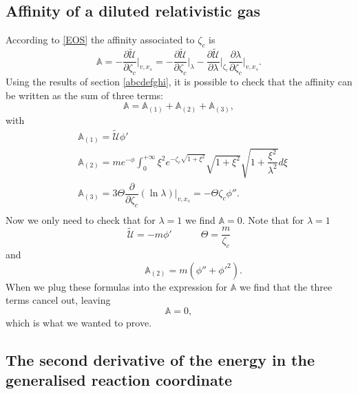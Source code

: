 \documentclass[useAMS,usenatbib,prd,twocolumn,nofootinbib]{revtex4-1}
\newcommand{\spc}{\quad \quad \quad}
\begin{document}
\subsection{Affinity of a diluted relativistic gas}\label{Aoadrg}

According to \eqref{EOS} the affinity associated to $\zeta_c$ is
\begin{equation}
\mathbb{A} = - \dfrac{\partial \tilde{\mathcal{U}}}{\partial \zeta_c} \bigg|_{v,x_s} = -\dfrac{\partial \tilde{\mathcal{U}}}{\partial \zeta_c} \bigg|_{\lambda} - \dfrac{\partial \tilde{\mathcal{U}}}{\partial \lambda} \bigg|_{\zeta_c} \dfrac{\partial \lambda}{\partial \zeta_c} \bigg|_{v,x_s} .
\end{equation}
Using the results of section \ref{abcdefghi}, it is possible to check that the affinity can be written as the sum of three terms:
\begin{equation}\label{zmalsjdhfhtyieo}
\mathbb{A} = \mathbb{A}_{(1)} + \mathbb{A}_{(2)} + \mathbb{A}_{(3)},
\end{equation} 
with
\begin{equation}
\begin{split}
& \mathbb{A}_{(1)} = \tilde{\mathcal{U}} \phi' \\
& \mathbb{A}_{(2)} = m e^{-\phi} \int_0^{+\infty} \xi^2 e^{-\zeta_c \sqrt{1+\xi^2}} \sqrt{1+\xi^2} \sqrt{1+ \dfrac{\xi^2}{\lambda^2}} d\xi \\
& \mathbb{A}_{(3)} =  3\Theta \dfrac{\partial}{\partial \zeta_c} (\ln \lambda)\bigg|_{v,x_s} = - \Theta \zeta_c \phi'' . \\
\end{split} 
\end{equation}
Now we only need to check that for $\lambda =1$ we find $\mathbb{A}=0$. Note that for $\lambda=1$
\begin{equation}\label{qmelyl}
  \tilde{\mathcal{U}} = - m \phi'  \spc \Theta =  \dfrac{m}{\zeta_c} 
\end{equation}
and
\begin{equation}
\spc \mathbb{A}_{(2)} =  m (\phi'' + {\phi'}^2).
\end{equation}
When we plug these formulas into the expression for $\mathbb{A}$ we find that the three terms cancel out, leaving
\begin{equation}
\mathbb{A} = 0,
\end{equation}
which is what we wanted to prove.

\subsection{The second derivative of the energy in the generalised reaction coordinate}\label{TSDOTEITGRC}
\end{document}
